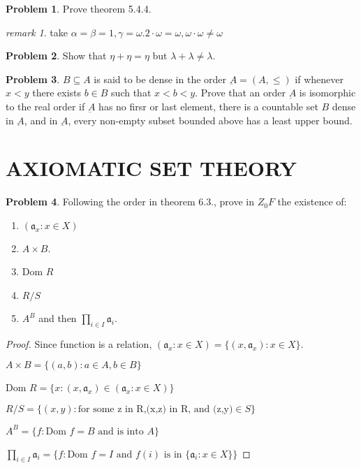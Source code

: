 \documentclass[a4paper,11pt]{article}%
\theoremstyle{remark}
\newtheorem*{remark}{remark}
\theoremstyle{definition}
\newtheorem{problem}{Problem}[subsection]
\begin{document}
\begin{problem}
    Prove theorem 5.4.4.
    \begin{remark}
        take $\alpha=\beta=1,\gamma=\omega.2\cdot\omega=\omega,\omega\cdot \omega\neq\omega$
    \end{remark}
\end{problem}
\begin{problem}
    Show that $\eta+\eta=\eta$ but $\lambda+\lambda\neq\lambda$.
\end{problem}
\begin{problem}
    $B\subseteq A$ is said to be dense in the order $\underbar{A}=(A,\leq)$
    if whenever $x<y$ there exists $b\in B$ such that $x<b<y$. Prove that an order $\underbar{A}$
    is isomorphic to the real order if $\underbar{A}$ has no firsr or last element,
    there is a countable set $B$ dense in $\underbar{A}$, and in $\underbar{A}$,
    every non-empty subset bounded above has a least upper bound.
\end{problem}
\section{AXIOMATIC SET THEORY}
\begin{problem}
    Following the order in theorem 6.3., prove in $Z_0F$ the existence of:
    \begin{enumerate}
        \item $(\mathfrak{a}_x:x\in X)$
        \item $A\times B$.
        \item Dom $R$
        \item $R/S$
        \item $A^B$ and then $\prod_{i\in I}\mathfrak{a}_i$.
    \end{enumerate}
    \begin{proof}
        Since function is a relation, $(\mathfrak{a}_x:x\in X)=\{(x,\mathfrak{a}_x):x\in X\}$.
        
        $A\times B=\{(a,b):a\in A,b\in B\}$

        Dom $R=\{x:(x,\mathfrak{a}_x)\in (\mathfrak{a}_x:x\in X)\}$

        $R/S=\{(x,y):\text{for some z in R,(x,z) in R, and (z,y)}\in  S \}$

        $A^B=\{f:\text{Dom }f =B \text{ and is into }A\}$

        $\prod_{i\in I}\mathfrak{a}_i=\{f:\text{Dom }f= I \text{ and }f(i) \text{ is in }\{\mathfrak{a}_i:x\in X\}\}$
    \end{proof}
\end{problem}
\end{document}
